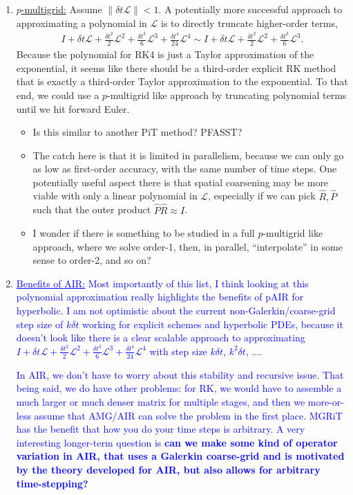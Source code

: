 \documentclass[a4paper,12pt]{article}
\newcommand{\tcb}{\textcolor{blue}}
\begin{document}
\begin{enumerate}
\item \underline{$p$-multigrid:} Assume $\|\delta t\mathcal{L}\| < 1$. A potentially more successful approach to approximating
a polynomial in $\mathcal{L}$ is to directly truncate higher-order terms,
\begin{align*}
I + \delta t\mathcal{L} + \tfrac{\delta t^2}{2}\mathcal{L}^2 + \tfrac{\delta t^3}{6}\mathcal{L}^3 +
	\tfrac{\delta t^4}{24}\mathcal{L}^4 \sim I + \delta t\mathcal{L} + \tfrac{\delta t^2}{2}\mathcal{L}^2 + \tfrac{\delta t^3}{6}\mathcal{L}^3.
\end{align*}
Because the polynomial for RK4 is just a Taylor approximation of the exponential, it seems like there should be a third-order
explicit RK method that is exactly a third-order Taylor approximation to the exponential. To that end, we could use a $p$-multigrid
like approach by truncating polynomial terms until we hit forward Euler. 
	\begin{itemize}
	\item Is this similar to another PiT method? PFASST?
	\item The catch here is that it is limited in parallelism, because we can only go as low as first-order accuracy, with the same
	number of time steps. One potentially useful aspect there is that spatial coarsening may be more viable with only a linear
	polynomial in $\mathcal{L}$, especially if we can pick $\hat{R},\hat{P}$ such that the outer product $\hat{P}\hat{R} \approx I$.
	\item I wonder if there is something to be studied in a full $p$-multigrid like approach, where we solve order-1, then, in parallel,
	``interpolate'' in some sense to order-2, and so on?
	\end{itemize}

\item \tcb{\underline{Benefits of AIR:} Most importantly of this list, I think looking at this polynomial approximation really highlights
the benefits of pAIR for hyperbolic. I am not optimistic about the current non-Galerkin/coarse-grid step size of $k\delta t$ working
for explicit schemes and hyperbolic PDEs, because it doesn't look like there is a clear scalable approach to approximating
$I + \delta t\mathcal{L} + \tfrac{\delta t^2}{2}\mathcal{L}^2 + \tfrac{\delta t^3}{6}\mathcal{L}^3 + \tfrac{\delta t^4}{24}\mathcal{L}^4$
with step size $k\delta t$, $k^2\delta t$, ....}

\tcb{\hspace{2ex} In AIR, we don't have to worry about this stability and recursive issue. That being said, we do have other problems: for RK, we
would have to assemble a much larger or much denser matrix for multiple stages, and then we more-or-less assume that AMG/AIR
can solve the problem in the first place. MGRiT has the benefit that how you do your time steps is arbitrary. A very interesting
longer-term question is \textbf{can we make some kind of operator variation in AIR, that uses a Galerkin coarse-grid and is
motivated by the theory developed for AIR, but also allows for arbitrary time-stepping?}}

\end{enumerate}
%
\end{document}
